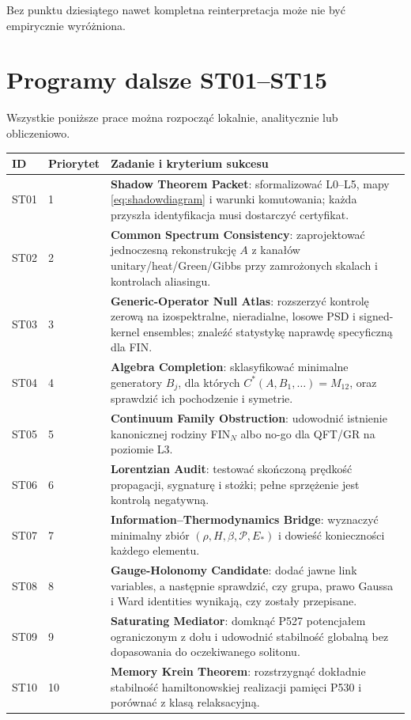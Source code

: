 \documentclass[11pt,a4paper]{article}
\begin{document}
Bez punktu dziesiątego nawet kompletna reinterpretacja może nie być empirycznie wyróżniona.

\section{Programy dalsze ST01--ST15}

Wszystkie poniższe prace można rozpocząć lokalnie, analitycznie lub obliczeniowo.

\begin{longtable}{@{}p{}p{}p{}@{}}
\toprule
ID & Priorytet & Zadanie i kryterium sukcesu\\
\midrule
ST01 & 1 & \textbf{Shadow Theorem Packet}: sformalizować L0--L5, mapy \eqref{eq:shadowdiagram} i warunki komutowania; każda przyszła identyfikacja musi dostarczyć certyfikat.\\
ST02 & 2 & \textbf{Common Spectrum Consistency}: zaprojektować jednoczesną rekonstrukcję $A$ z kanałów unitary/heat/Green/Gibbs przy zamrożonych skalach i kontrolach aliasingu.\\
ST03 & 3 & \textbf{Generic-Operator Null Atlas}: rozszerzyć kontrolę zerową na izospektralne, nieradialne, losowe PSD i signed-kernel ensembles; znaleźć statystykę naprawdę specyficzną dla FIN.\\
ST04 & 4 & \textbf{Algebra Completion}: sklasyfikować minimalne generatory $B_j$, dla których $C^*(A,B_1,\ldots)=M_{12}$, oraz sprawdzić ich pochodzenie i symetrie.\\
ST05 & 5 & \textbf{Continuum Family Obstruction}: udowodnić istnienie kanonicznej rodziny FIN$_N$ albo no-go dla QFT/GR na poziomie L3.\\
ST06 & 6 & \textbf{Lorentzian Audit}: testować skończoną prędkość propagacji, sygnaturę i stożki; pełne sprzężenie jest kontrolą negatywną.\\
ST07 & 7 & \textbf{Information--Thermodynamics Bridge}: wyznaczyć minimalny zbiór $(\rho,H,\beta,\mathcal P,E_*)$ i dowieść konieczności każdego elementu.\\
ST08 & 8 & \textbf{Gauge-Holonomy Candidate}: dodać jawne link variables, a następnie sprawdzić, czy grupa, prawo Gaussa i Ward identities wynikają, czy zostały przepisane.\\
ST09 & 9 & \textbf{Saturating Mediator}: domknąć P527 potencjałem ograniczonym z dołu i udowodnić stabilność globalną bez dopasowania do oczekiwanego solitonu.\\
ST10 & 10 & \textbf{Memory Krein Theorem}: rozstrzygnąć dokładnie stabilność hamiltonowskiej realizacji pamięci P530 i porównać z klasą relaksacyjną.\\

\end{longtable}
\end{document}
